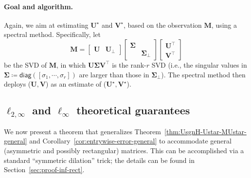 \paragraph{Goal and algorithm.}
Again, we aim at estimating $\bm{U}^{\star}$ and $\bm{V}^{\star}$, based
on the observation $\bm{M}$, using a spectral method. Specifically, let
%
\begin{equation}
\bm{M}=\left[\begin{array}{cc}
\bm{U} & \bm{U}_{\perp}\end{array}\right]\left[\begin{array}{cc}
\bm{\Sigma}\\
 & \bm{\Sigma}_{\perp}
\end{array}\right]\left[\begin{array}{c}
\bm{U}^{\top}\\
\bm{V}^{\top}
\end{array}\right]\label{eq:general-M-SVD}
\end{equation}
be the SVD of $\bm{M}$, in which $\bm{U}\bm{\Sigma}\bm{V}^{\top}$
is the rank-$r$ SVD (i.e., the singular values in $\bm{\Sigma}\coloneqq\mathsf{diag}([\sigma_{1},\cdots,\sigma_{r}])$
are larger than those in $\bm{\Sigma}_{\perp}$). The spectral method then
	deploys ($\bm{U},\bm{V}$) as an estimate of ($\bm{U}^{\star},\bm{V}^{\star}$).


	

\subsection{$\ell_{2,\infty}$ and $\ell_{\infty}$ theoretical guarantees}
\label{sec:theory-Linf-SVD-general}

We now present a theorem that generalizes Theorem~\ref{thm:UsgnH-Ustar-MUstar-general} and Corollary~\ref{cor:entrywise-error-general} to accommodate general (asymmetric and possibly rectangular) matrices. This can be accomplished via a standard ``symmetric dilation'' trick; the details can be found in Section~\ref{sec:proof-inf-rect}.  



